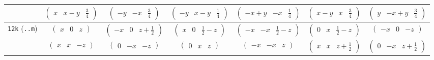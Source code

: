 \documentclass[fleqn,9pt,landscape]{jsarticle}
\begin{document}
\begin{center}
\begin{longtable}{ccccccc}
& $ \begin{pmatrix} x & x - y & \frac{3}{4} \end{pmatrix} $ & $ \begin{pmatrix} - y & - x & \frac{3}{4} \end{pmatrix} $ & $ \begin{pmatrix} - y & x - y & \frac{1}{4} \end{pmatrix} $ & $ \begin{pmatrix} - x + y & - x & \frac{1}{4} \end{pmatrix} $ & $ \begin{pmatrix} x - y & x & \frac{3}{4} \end{pmatrix} $ & $ \begin{pmatrix} y & - x + y & \frac{3}{4} \end{pmatrix} $ \\ \hline
{\tt 12k} ({\tt ..m}) & $ \begin{pmatrix} x & 0 & z \end{pmatrix} $ & $ \begin{pmatrix} - x & 0 & z + \frac{1}{2} \end{pmatrix} $ & $ \begin{pmatrix} x & 0 & \frac{1}{2} - z \end{pmatrix} $ & $ \begin{pmatrix} - x & - x & \frac{1}{2} - z \end{pmatrix} $ & $ \begin{pmatrix} 0 & x & \frac{1}{2} - z \end{pmatrix} $ & $ \begin{pmatrix} - x & 0 & - z \end{pmatrix} $ \\
& $ \begin{pmatrix} x & x & - z \end{pmatrix} $ & $ \begin{pmatrix} 0 & - x & - z \end{pmatrix} $ & $ \begin{pmatrix} 0 & x & z \end{pmatrix} $ & $ \begin{pmatrix} - x & - x & z \end{pmatrix} $ & $ \begin{pmatrix} x & x & z + \frac{1}{2} \end{pmatrix} $ & $ \begin{pmatrix} 0 & - x & z + \frac{1}{2} \end{pmatrix} $ \\ \hline

\end{longtable}
\end{center}
\end{document}
